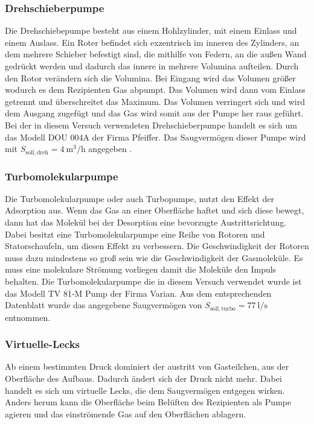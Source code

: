 \subsubsection{Drehschieberpumpe}
Die Drehschiebepumpe besteht aus einem Hohlzylinder, mit einem Einlass und einem Auslass. Ein Roter befindet sich exzentrisch im inneren des Zylinders, an dem mehrere Schieber befestigt sind, die mithilfe von Federn, an die außen Wand gedrückt werden und dadurch das innere in mehrere Volumina aufteilen. Durch den Rotor verändern sich die Volumina. Bei Eingang wird das Volumen größer wodurch es dem Rezipienten Gas abpumpt. Das Volumen wird dann vom Einlass getrennt und überschreitet das Maximum. Das Volumen verringert sich  und wird dem Ausgang zugefügt und das Gas wird somit aus der Pumpe her raus geführt.
Bei der in diesem Versuch verwendeten Drehschieberpumpe handelt es sich um das Modell DOU 004A der Firma Pfeiffer. Das Saugvermögen dieser Pumpe wird mit $S_{\mathrm{soll,dreh}} =\SI{4}{\m\cubed\per\hour}$ angegeben \cite{PlaketteV70}.


\subsubsection{Turbomolekularpumpe}
Die Turbomolekularpumpe oder auch Turbopumpe, nutzt den Effekt der Adsorption aus. Wenn das Gas an einer Oberfläche haftet und sich diese bewegt, dann hat das Molekül bei der Desorption eine bevorzugte Austrittsrichtung. Dabei besitzt eine Turbomolekularpumpe eine Reihe von Rotoren und Statorschaufeln, um diesen Effekt zu verbessern. Die Geschwindigkeit der Rotoren muss dazu mindestens so groß sein wie die Geschwindigkeit der Gasmoleküle. Es muss eine molekulare Strömung vorliegen damit die Moleküle den Impuls behalten.
Die Turbomolekularpumpe die in diesem Versuch verwendet wurde ist
das Modell TV 81-M Pump der Firma Varian. Aus dem entsprechenden Datenblatt 
\cite{DatenblattV70} wurde das angegebene Saugvermögen von 	
$S_{\mathrm{soll,turbo}} = \SI{77}{\l\per\s}$ entnommen.

\subsubsection{Virtuelle-Lecks}
Ab einem bestimmten Druck dominiert der austritt von Gasteilchen, aus der Oberfläche des Aufbaus. Dadurch ändert sich der Druck nicht mehr. Dabei handelt es sich um virtuelle Lecks, die dem Saugvermögen entgegen wirken. Anders herum kann die Oberfläche beim Belüften des Rezipienten als Pumpe agieren und das einströmende Gas auf den Oberflächen ablagern.
